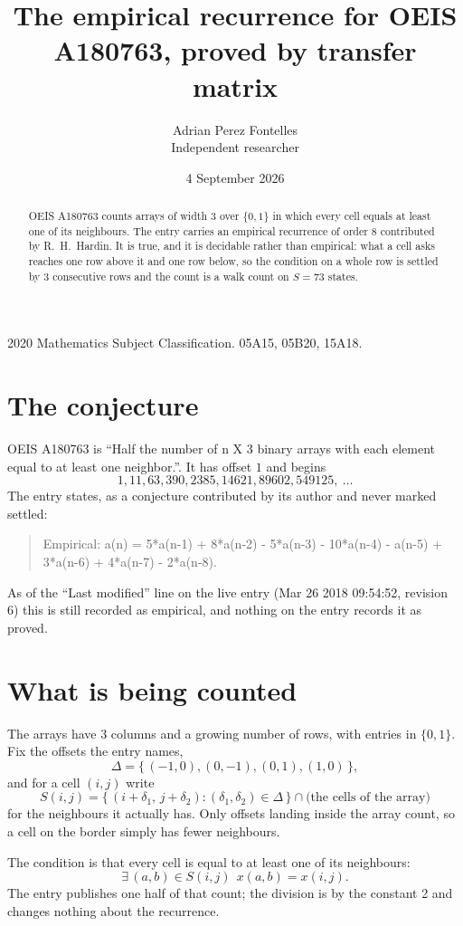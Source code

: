 \documentclass[11pt,a4paper]{article}
\title{The empirical recurrence for OEIS A180763, proved by transfer matrix}
\author{Adrian Perez Fontelles\\ \small Independent researcher}
\date{4 September 2026}
\theoremstyle{plain}
\theoremstyle{definition}
\begin{document}
\maketitle

\begin{abstract}
OEIS A180763 counts arrays of width $3$ over $\{0,1\}$ in which every cell equals at least one of its neighbours. The entry carries an
empirical recurrence of order $8$ contributed by R.~H.~Hardin. It is true, and it is
decidable rather than empirical: what a cell asks reaches one row above it and one row below, so the
condition on a whole row is settled by $3$ consecutive rows and the count is a walk
count on $S=73$ states.
\end{abstract}

\noindent\small 2020 Mathematics Subject Classification. 05A15, 05B20, 15A18.\normalsize

\section{The conjecture}

OEIS A180763 is ``Half the number of n X 3 binary arrays with each element equal to at least one neighbor.''. It has offset $1$ and begins
\[
1, 11, 63, 390, 2385, 14621, 89602, 549125,\ \dots
\]
The entry states, as a conjecture contributed by its author and never marked settled:
\begin{quote}
Empirical: a(n) = 5*a(n-1) + 8*a(n-2) - 5*a(n-3) - 10*a(n-4) - a(n-5) + 3*a(n-6) + 4*a(n-7) - 2*a(n-8).
\end{quote}
As of the ``Last modified'' line on the live entry (Mar 26 2018 09:54:52, revision 6) this is still
recorded as empirical, and nothing on the entry records it as proved.

\section{What is being counted}

The arrays have $3$ columns and a growing number of rows, with entries in $\{0,1\}$. Fix the
offsets the entry names,
\[
\Delta=\{\,(-1,0), (0,-1), (0,1), (1,0)\,\},
\]
and for a cell $(i,j)$ write
\[
S(i,j)=\{\,(i+\delta_1,\,j+\delta_2) : (\delta_1,\delta_2)\in\Delta\,\}\cap
\text{(the cells of the array)}
\]
for the neighbours it actually has. Only offsets landing inside the array count, so a cell on
the border simply has fewer neighbours.

The condition is that every cell is equal to at least one of its neighbours:
\[
\exists\,(a,b)\in S(i,j)\ \ x(a,b)=x(i,j).
\]
 The entry publishes one half of that count; the division is by the constant 2 and changes nothing about the recurrence.
\end{document}
